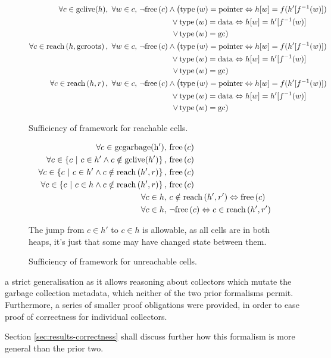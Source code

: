 \begin{figure}[H]
  \begin{align*}
    \forall c \in \mathrm{gclive}(h),\ \forall w \in c,\ & \lnot\free{c}
      \land \left(\type{w} = \typointer \iff h[w] =
      f(h'[f^{-1}(w)])\right.\\
    &\quad\quad\quad\quad \lor \type{w} = \tydata
    \iff h[w] = h'[f^{-1}(w)]\\
    &\quad\quad\quad\quad \left.\lor\thinspace\type{w} =
      \tygc\right)\\
%
    \forall c \in \reach{h}{\mathrm{gcroots}},\ \forall w \in c,\ &
      \lnot\free{c} \land \left(\type{w} = \typointer \iff
      h[w] = f(h'[f^{-1}(w)])\right.\\
    &\quad\quad\quad\quad \lor \type{w} = \tydata
      \iff h[w] = h'[f^{-1}(w)]\\
    &\quad\quad\quad\quad \left.\lor\thinspace\type{w} =
      \tygc\right)\\
%
    \forall c \in \reach{h}{r},\ \forall w \in c,\ & \lnot\free{c} \land
      \left(\type{w} = \typointer \iff
      h[w] = f(h'[f^{-1}(w)])\right.\\
    &\quad\quad\quad\quad \lor \type{w} = \tydata
      \iff h[w] = h'[f^{-1}(w)]\\
    &\quad\quad\quad\quad \left.\lor\thinspace\type{w} =
      \tygc\right)
  \end{align*}
  \captionsetup{format=default}
  \caption{Sufficiency of framework for reachable cells.}
  \label{fig:gc-framework-sufficiency-reachable}
\end{figure}
\begin{figure}[H]
  \begin{align*}
    \forall c \in \mathrm{gcgarbage(h')},\ & \mathrm{free}\left(c\right)\\
    \forall c \in \left\{c~|~c \in h' \land c \notin
      \mathrm{gclive}(h')\right\},\ & \mathrm{free}\left(c\right)\\
    \forall c \in \left\{c~|~c \in h' \land c \notin
      \mathrm{reach}\left(h', r\right)\right\},\ & \mathrm{free}\left(c\right)\\
    \forall c \in \left\{c~|~c \in h \land c \notin
      \mathrm{reach}\left(h', r\right)\right\},\ & \mathrm{free}\left(c\right)\\
    \forall c \in h,\ & c \notin \mathrm{reach}\left(h', r'\right) \Leftrightarrow \mathrm{free}\left(c\right)\\
    \forall c \in h,\ & \lnot\mathrm{free}\left(c\right) \Leftrightarrow c \in \mathrm{reach}\left(h', r'\right)
  \end{align*}

  The jump from $c \in h'$ to $c \in h$ is allowable, as all cells are
  in both heaps, it's just that some may have changed state between
  them.
  \caption{Sufficiency of framework for unreachable cells.}
  \label{fig:gc-framework-sufficiency-unreachable}
\end{figure}

\noindent a strict generalisation as it allows reasoning about
collectors which mutate the garbage collection metadata, which neither
of the two prior formalisms permit. Furthermore, a series of smaller
proof obligations were provided, in order to ease proof of correctness
for individual collectors.

Section \ref{sec:results-correctness} shall discuss further how this
formalism is more general than the prior two.
